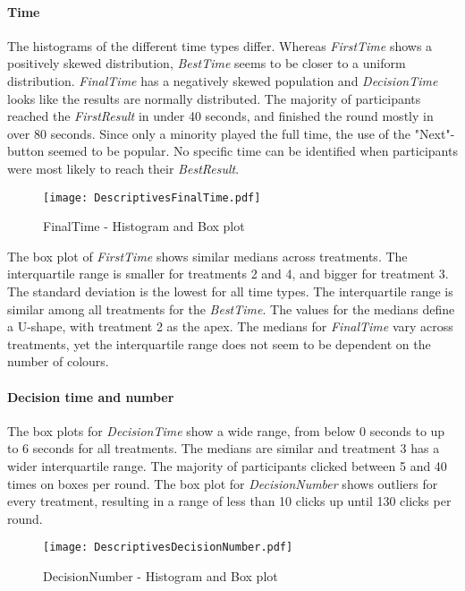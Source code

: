 \paragraph{Time}
\label{ch:Evaluation:sec:DescriptiveStatistics:subsec:Time}
The histograms of the different time types differ. Whereas \textit{FirstTime} shows a positively skewed distribution, \textit{BestTime} seems to be closer to a uniform distribution. \textit{FinalTime} has a negatively skewed population and \textit{DecisionTime} looks like the results are normally distributed. The majority of participants reached the \textit{FirstResult} in under 40 seconds, and finished the round mostly in over 80 seconds. Since only a minority played the full time, the use of the "Next"-button seemed to be popular. No specific time can be identified when participants were most likely to reach their \textit{BestResult}.
\begin{figure}[htbp] %
\begin{center}
  \caption{FinalTime - Histogram and Box plot}
   \label{DistributionFinalTime} 
 \texttt{[image: DescriptivesFinalTime.pdf]}
\end{center}
\end{figure}
The box plot of \textit{FirstTime} shows similar medians across treatments. The interquartile range is smaller for treatments 2 and 4, and bigger for treatment 3. The standard deviation is the lowest for all time types. The interquartile range is similar among all treatments for the \textit{BestTime}. The values for the medians define a U-shape, with treatment 2 as the apex. The medians for \textit{FinalTime} vary across treatments, yet the interquartile range does not seem to be dependent on the number of colours.

\paragraph{Decision time and number}
The box plots for \textit{DecisionTime} show a wide range, from below 0 seconds to up to 6 seconds for all treatments. The medians are similar and treatment 3 has a wider interquartile range. The majority of participants clicked between 5 and 40 times on boxes per round. The box plot for \textit{DecisionNumber} shows outliers for every treatment, resulting in a range of less than 10 clicks up until 130 clicks per round.
\begin{figure}[htbp] %
\begin{center} 
\texttt{[image: DescriptivesDecisionNumber.pdf]}
  \caption{DecisionNumber - Histogram and Box plot}
    \label{DistributionDecisionNumber} 
\end{center}
\end{figure}

